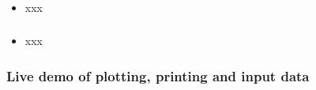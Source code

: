 \documentclass[14pt]{beamer}
\begin{document}
\begin{frame}[fragile]
\frametitle{}
\begin{itemize}
\item xxx
\end{itemize}

\end{frame}


\begin{frame}[fragile]
\frametitle{}
\begin{itemize}
\item xxx
\end{itemize}

\end{frame}


\begin{frame}[fragile]
\frametitle{Live demo of plotting, printing and input data}

\end{frame}
\end{document}
